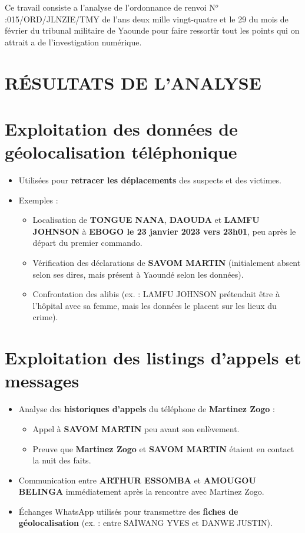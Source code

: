 \documentclass[12pt, a4em]{article}
\begin{document}
	Ce travail consiste a l'analyse de l'ordonnance de renvoi N$^o$:015/ORD/JLNZIE/TMY de l'ans deux mille vingt-quatre et le 29 du mois de février du tribunal militaire de Yaounde  pour faire ressortir tout les points qui on attrait a de l'investigation numérique.
	
	\pagebreak
	
	\section*{RÉSULTATS DE L'ANALYSE}
	
	\section*{Exploitation des données de géolocalisation téléphonique}
	\begin{itemize}[leftmargin=*]
		\item Utilisées pour \textbf{retracer les déplacements} des suspects et des victimes.
		\item Exemples :
		\begin{itemize}
			\item Localisation de \textbf{TONGUE NANA}, \textbf{DAOUDA} et \textbf{LAMFU JOHNSON} à \textbf{EBOGO le 23 janvier 2023 vers 23h01}, peu après le départ du premier commando.
			\item Vérification des déclarations de \textbf{SAVOM MARTIN} (initialement absent selon ses dires, mais présent à Yaoundé selon les données).
			\item Confrontation des alibis (ex. : LAMFU JOHNSON prétendait être à l'hôpital avec sa femme, mais les données le placent sur les lieux du crime).
		\end{itemize}
	\end{itemize}
	
	\section*{Exploitation des listings d'appels et messages}
	\begin{itemize}[leftmargin=*]
		\item Analyse des \textbf{historiques d'appels} du téléphone de \textbf{Martinez Zogo} :
		\begin{itemize}
			\item Appel à \textbf{SAVOM MARTIN} peu avant son enlèvement.
			\item Preuve que \textbf{Martinez Zogo} et \textbf{SAVOM MARTIN} étaient en contact la nuit des faits.
		\end{itemize}
		\item Communication entre \textbf{ARTHUR ESSOMBA} et \textbf{AMOUGOU BELINGA} immédiatement après la rencontre avec Martinez Zogo.
		\item Échanges WhatsApp utilisés pour transmettre des \textbf{fiches de géolocalisation} (ex. : entre SAÏWANG YVES et DANWE JUSTIN).
	\end{itemize}
	
\end{document}
